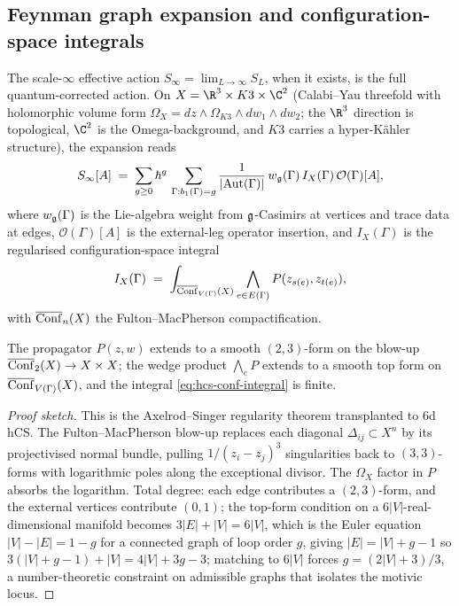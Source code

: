 \subsection{Feynman graph expansion and configuration-space integrals}
\label{subsec:hcs-feynman}

The scale-$\infty$ effective action
$S_{\infty} = \lim_{L\to\infty}S_{L}$, when it exists, is the full
quantum-corrected action. On
$X = \R^{3}\times K3\times\C^{2}$ (Calabi--Yau threefold with
holomorphic volume form $\Omega_{X} = dz\wedge\Omega_{K3}\wedge dw_{1}\wedge dw_{2}$;
the $\R^{3}$ direction is topological, $\C^{2}$ is the Omega-background,
and $K3$ carries a hyper-K\"ahler structure), the expansion reads
\begin{equation}\label{eq:hcs-feynman-expansion}
 S_{\infty}[A]
 \;=\;
 \sum_{g\ge 0}\hbar^{g}\,
 \sum_{\Gamma:b_{1}(\Gamma) = g}
 \frac{1}{|\mathrm{Aut}(\Gamma)|}\,
 w_{\mathfrak{g}}(\Gamma)\,
 I_{X}(\Gamma)\,
 \mathcal{O}(\Gamma)[A],
\end{equation}
where $w_{\mathfrak{g}}(\Gamma)$ is the Lie-algebra weight from $\mathfrak{g}$-Casimirs at
vertices and trace data at edges, $\mathcal{O}(\Gamma)[A]$ is the
external-leg operator insertion, and $I_{X}(\Gamma)$ is the
regularised configuration-space integral
\begin{equation}\label{eq:hcs-conf-integral}
 I_{X}(\Gamma)
 \;=\;
 \int_{\overline{\mathrm{Conf}}_{V(\Gamma)}(X)}
 \bigwedge_{e\in E(\Gamma)} P(z_{s(e)},z_{t(e)}),
\end{equation}
with $\overline{\mathrm{Conf}}_{n}(X)$ the Fulton--MacPherson compactification.

\begin{proposition}
\label{prop:hcs-integrand-regular}
\ClaimStatusProvedElsewhere
The propagator $P(z,w)$ extends to a smooth $(2,3)$-form on the
blow-up $\overline{\mathrm{Conf}}_{2}(X)\to X\times X$; the wedge product
$\bigwedge_{e}P$ extends to a smooth top form on
$\overline{\mathrm{Conf}}_{V(\Gamma)}(X)$, and the integral
\eqref{eq:hcs-conf-integral} is finite.
\end{proposition}

\begin{proof}[Proof sketch]
This is the Axelrod--Singer regularity theorem
\cite{Kon94} transplanted to 6d hCS. The Fulton--MacPherson blow-up
replaces each diagonal $\Delta_{ij}\subset X^{n}$ by its projectivised
normal bundle, pulling $1/(z_{i}-z_{j})^{3}$ singularities back to
$(3,3)$-forms with logarithmic poles along the exceptional divisor. The
$\Omega_{X}$ factor in $P$ absorbs the logarithm. Total degree:
each edge contributes a $(2,3)$-form, and the external vertices
contribute $(0,1)$; the top-form condition on a $6|V|$-real-dimensional
manifold becomes $3|E|+|V|=6|V|$, which is the Euler equation
$|V|-|E| = 1-g$ for a connected graph of loop order $g$, giving
$|E| = |V|+g-1$ so $3(|V|+g-1)+|V| = 4|V|+3g-3$; matching to
$6|V|$ forces $g = (2|V|+3)/3$, a number-theoretic constraint on
admissible graphs that isolates the motivic locus.
\end{proof}

